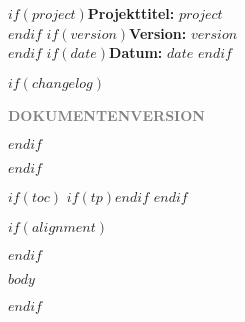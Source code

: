 \documentclass[table,xcdraw,11pt,a4paper]{scrartcl}
\begin{document}
    
    $if(project)$\textbf{Projekttitel:} $project$\\$endif$
    $if(version)$\textbf{Version:} $version$ \\$endif$
    $if(date)$\textbf{Datum:} $date$ $endif$
      
    \vspace*{1cm}

    $if(changelog)$
    
    \textcolor{gray}{\textbf{\uppercase{Dokumentenversion}}}

    \begin{table}[!htb]
    \small
    \end{table}
    $endif$
    \vspace{2cm}

$endif$

$if(toc)$
\tableofcontents
$if(tp)$\newpage$endif$
$endif$


$if(alignment)$
\begin{$alignment$}
$endif$

$body$

\end{$alignment$}
$endif$
\end{document}
